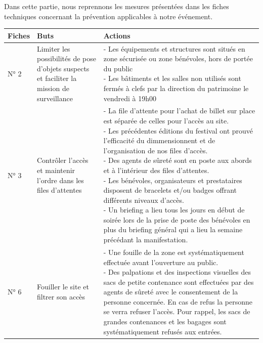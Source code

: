 \documentclass[hidelinks, paper=a4, fontsize=13pt]{report}
\begin{document}
Dans cette partie, nous reprennons les mesures présentées dans les fiches techniques concernant la prévention applicables à notre événement.
\begin{center}
\begin{tabular}{| p{1.5cm} | p{4cm} | p{10cm} |}
\shrinkheight{1cm} 
  \hline
  \cellcolor[gray]{0.9} \textbf{Fiches} & \cellcolor[gray]{0.9} \textbf{Buts} & \cellcolor[gray]{0.9} \textbf{Actions} \\
  \hline
  N° 2 & 
  \parbox[t]{4cm}{Limiter les possibilités de pose d'objets suspects et faciliter la mission de surveillance} & 
  \parbox[t]{10cm}{- Les équipements et structures sont situés en zone sécurisée ou zone bénévoles, hors de portée du public\\
  - Les bâtiments et les salles non utilisés sont fermés à clefs par la direction du patrimoine le vendredi à 19h00\\}
 \\
 \hline
  N° 3 &
  \parbox[t]{4cm}{Contrôler l'accès et maintenir l'ordre dans les files d'attentes} & 
  \parbox[t]{10cm}{- La file d'attente pour l'achat de billet sur place est séparée de celles pour l'accès au site.\\
  - Les précédentes éditions du festival ont prouvé l'efficacité du dimmensionnent et de l'organisation de nos files d'accès.\\
  - Des agents de sûreté sont en poste aux abords et à l'intérieur des files d'attentes.\\
  - Les bénévoles, organisateurs et prestataires disposent de bracelets et/ou badges offrant différents niveaux d'accès.\\
  - Un briefing a lieu tous les jours en début de soirée lors de la prise de poste des bénévoles en plus du briefing général qui a lieu la semaine précédant la manifestation.\\}
 \\
 \hline
  N° 6 &
  \parbox[t]{4cm}{Fouiller le site et filtrer son accès} & 
  \parbox[t]{10cm}{- Une fouille de la zone est systématiquement effectuée avant l'ouverture au public.\\
  - Des palpations et des inspections visuelles des sacs de petite contenance sont effectuées par des agents de sûreté avec le consentement de la personne concernée. En cas de refus la personne se verra refuser l'accès. Pour rappel, les sacs de grandes contenances et les bagages sont systématiquement refusés aux entrées.\\}
 \\
 \hline

\end{tabular}
\end{center}
\end{document}
